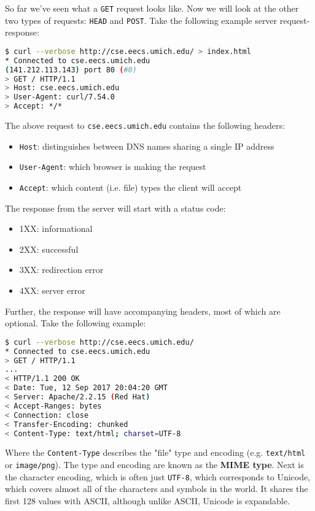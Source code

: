 So far we've seen what a \texttt{GET} request looks like. Now we will look at the other two types of requests: \texttt{HEAD} and \texttt{POST}. Take the following example server request-response:
\begin{lstlisting}[language=bash]
$ curl --verbose http://cse.eecs.umich.edu/ > index.html
* Connected to cse.eecs.umich.edu	
(141.212.113.143) port 80 (#0)
> GET / HTTP/1.1
> Host: cse.eecs.umich.edu
> User-Agent: curl/7.54.0
> Accept: */*
\end{lstlisting}

The above request to \texttt{cse.eecs.umich.edu} contains the following headers:
\begin{itemize}
	\item \texttt{Host}: distinguishes between DNS names sharing a single IP address
	\item \texttt{User-Agent}: which browser is making the request
	\item \texttt{Accept}: which content (i.e. file) types the client will accept
\end{itemize}

The response from the server will start with a status code:
\begin{itemize}
	\item 1XX: informational
	\item 2XX: successful
	\item 3XX: redirection error
	\item 4XX: server error
\end{itemize}
Further, the response will have accompanying headers, most of which are optional. Take the following example:
\begin{lstlisting}[language=bash]
$ curl --verbose http://cse.eecs.umich.edu/
* Connected to cse.eecs.umich.edu
> GET / HTTP/1.1
...
< HTTP/1.1 200 OK
< Date: Tue, 12 Sep 2017 20:04:20 GMT
< Server: Apache/2.2.15 (Red Hat)
< Accept-Ranges: bytes
< Connection: close
< Transfer-Encoding: chunked
< Content-Type: text/html; charset=UTF-8	
\end{lstlisting}

Where the \texttt{Content-Type} describes the "file" type and encoding (e.g. \texttt{text/html} or \texttt{image/png}). The type and encoding are known as the \textbf{MIME type}. Next is the character encoding, which is often just \texttt{UTF-8}, which corresponds to Unicode, which covers almost all of the characters and symbols in the world. It shares the first 128 values with ASCII, although unlike ASCII, Unicode is expandable.

